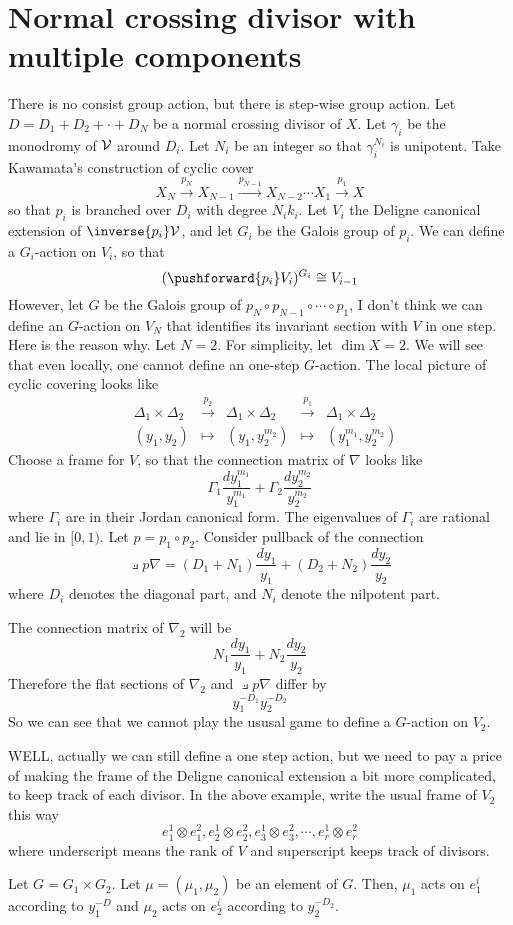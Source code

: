 \documentclass{article}
\begin{document}
\section{Normal crossing divisor with multiple components}
There is no consist group action, but there is step-wise group action. 
Let $D = D_1 + D_2 + \cdot + D_N$ be a normal crossing divisor of $X$. 
Let $\gamma_i$ be the monodromy of $\mathcal{V}$ around $D_i$. Let $N_i$ be an
integer so that $\gamma_i^{N_i}$ is unipotent. Take Kawamata's
construction of cyclic cover
\[
     X_N \xrightarrow{p_N} X_{N-1} \xrightarrow{p_{N-1}} X_{N-2}\cdots X_1 \xrightarrow{p_1} X
\]
so that $p_i$ is branched over $D_i$ with degree $N_ik_i$. 
Let $V_i$ the Deligne canonical extension of $\inverse{p_i}\V$, and let $G_i$ 
be the Galois group of $p_i$. We can define a $G_i$-action on $V_i$, so that
\[
    (\pushforward{p_i}V_i)^{G_i} \cong V_{i-1}
\]
However, let $G$ be the Galois group of $p_N\circ p_{N-1}\circ\cdots\circ p_1$, 
I don't think we can define an $G$-action on $V_N$ that identifies its invariant
section with $V$ in one step. Here is the reason why. Let $N = 2$. For simplicity,
let $\dim X = 2$. We will see that even locally, one cannot define an one-step 
$G$-action. The local picture of cyclic covering looks like
\begin{align*}
    & \Delta_1\times\Delta_2 & \xrightarrow{p_2} & \Delta_1\times\Delta_2 & \xrightarrow{p_1} &\Delta_1\times\Delta_2 \\
    & (y_1, y_2) & \mapsto                       & (y_1, y_2^{m_2})       & \mapsto           & (y_1^{m_1}, y_2^{m_2}) 
\end{align*}
Choose a frame for $V$, so that the connection matrix of $\nabla$ looks like
\[
    \Gamma_1\frac{dy_1^{m_1}}{y_1^{m_1}} + \Gamma_2\frac{dy_2^{m_2}}{y_2^{m_2}}
\]
where $\Gamma_i$ are in their Jordan canonical form. 
The eigenvalues of $\Gamma_i$ are rational and lie in $[0, 1)$. Let $p = p_1\circ p_2$.
Consider pullback of the connection
\[
    \pullback{p}\nabla = (D_1 + N_1)\frac{dy_1}{y_1} + (D_2 + N_2)\frac{dy_2}{y_2}
\]
where $D_i$ denotes the diagonal part, and $N_i$ denote the nilpotent part.

The connection matrix of $\nabla_2$ will be 
\[
    N_1\frac{dy_1}{y_1} + N_2\frac{dy_2}{y_2}
\]
Therefore the flat sections of $\nabla_2$ and $\pullback{p}\nabla$ differ by
\[
    y_1^{-D_1}y_2^{-D_2}
\]
So we can see that we cannot play the ususal game to define a $G$-action on $V_2$.

WELL, actually we can still define a one step action, but we need to pay a price
of making the frame of the Deligne canonical extension a bit more complicated,
to keep track of each divisor. In the above example, write the usual frame of $V_2$
this way
\[
    e_1^1\otimes e_1^2, e_2^1\otimes e_2^2, e_3^1\otimes e_3^2, \cdots, e_r^1\otimes e_r^2
\]
where underscript means the rank of $V$ and superscript keeps track of divisors.

Let $G = G_1\times G_2$. Let $\mu = (\mu_1, \mu_2)$ be an element of $G$. 
Then, $\mu_1$ acts on $e_1^i$ according to $y_1^{-D}$ and $\mu_2$ acts on $e_2^i$
according to $y_2^{-D_2}$. 
\end{document}
